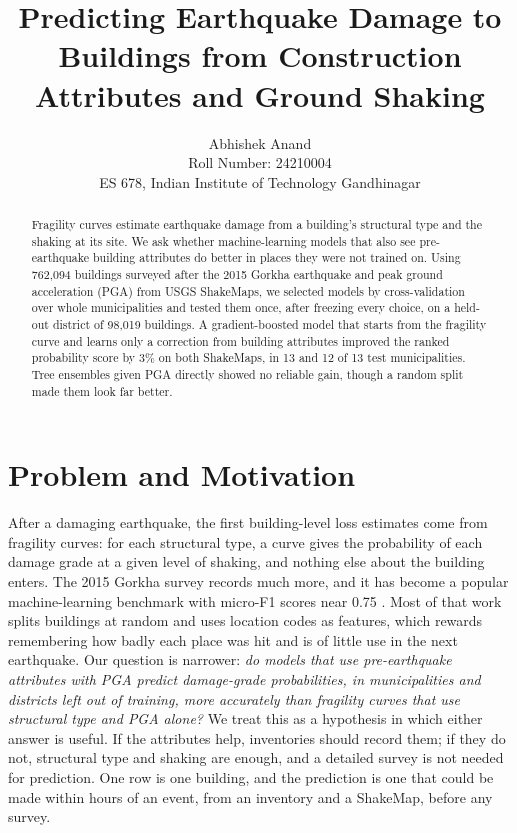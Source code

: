 \documentclass{article}
\title{Predicting Earthquake Damage to Buildings from Construction Attributes and Ground Shaking}
\author{%
  Abhishek Anand \\
  Roll Number: 24210004 \\
  ES 678, Indian Institute of Technology Gandhinagar
}
\begin{document}
\maketitle

\begin{abstract}
Fragility curves estimate earthquake damage from a building's structural type and the shaking at its site. We ask
whether machine-learning models that also see pre-earthquake building attributes do better in places they were not
trained on. Using 762,094 buildings surveyed after the 2015 Gorkha earthquake and peak ground acceleration (PGA)
from USGS ShakeMaps, we selected models by cross-validation over whole municipalities and tested them once, after
freezing every choice, on a held-out district of 98,019 buildings. A gradient-boosted model that starts from the
fragility curve and learns only a correction from building attributes improved the ranked probability score by
3\% on both ShakeMaps, in 13 and 12 of 13 test municipalities. Tree ensembles given PGA directly showed no
reliable gain, though a random split made them look far better.
\end{abstract}

\section{Problem and Motivation}
After a damaging earthquake, the first building-level loss estimates come from fragility curves: for each
structural type, a curve gives the probability of each damage grade at a given level of shaking, and nothing else
about the building enters. The 2015 Gorkha survey records much more, and it has become a popular machine-learning
benchmark with micro-F1 scores near 0.75 \citep{drivendata}. Most of that work splits buildings at random and uses
location codes as features, which rewards remembering how badly each place was hit and is of little use in the
next earthquake. Our question is narrower: \emph{do models that use pre-earthquake attributes with PGA predict
damage-grade probabilities, in municipalities and districts left out of training, more accurately than fragility
curves that use structural type and PGA alone?} We treat this as a hypothesis in which either answer is useful. If
the attributes help, inventories should record them; if they do not, structural type and shaking are enough, and
a detailed survey is not needed for prediction. One row is one building, and the prediction is one that could be
made within hours of an event, from an inventory and a ShakeMap, before any survey.
\end{document}
